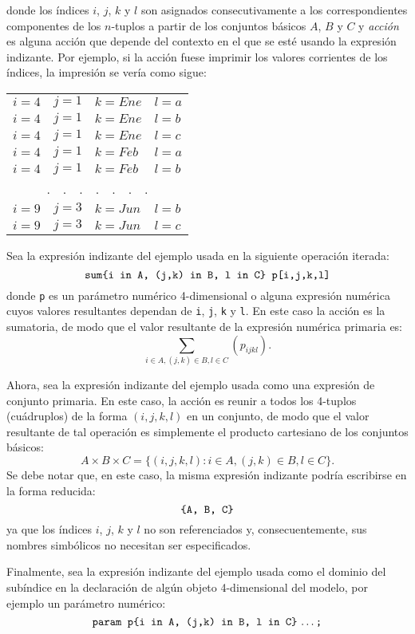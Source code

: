 \documentclass[11pt,spanish]{report}
\begin{document}
\noindent donde los índices $i$, $j$, $k$ y $l$ son asignados consecutivamente a los correspondientes componentes de los $n$-tuplos a partir de los conjuntos básicos $A$, $B$ y $C$ y {\it acción} es alguna acción que depende del contexto en el que se esté usando la expresión indizante. Por ejemplo, si la acción fuese imprimir los valores corrientes de los índices, la impresión se vería como sigue:

\noindent\hfil
\begin{tabular}{@{}llll@{}}
$i=4$&$j=1$&$k=Ene$&$l=a$\\
$i=4$&$j=1$&$k=Ene$&$l=b$\\
$i=4$&$j=1$&$k=Ene$&$l=c$\\
$i=4$&$j=1$&$k=Feb$&$l=a$\\
$i=4$&$j=1$&$k=Feb$&$l=b$\\
\multicolumn{4}{c}{.\ \ .\ \ .\ \ .\ \ .\ \ .\ \ .}\\
$i=9$&$j=3$&$k=Jun$&$l=b$\\
$i=9$&$j=3$&$k=Jun$&$l=c$\\
\end{tabular}

Sea la expresión indizante del ejemplo usada en la siguiente operación iterada:
$$\mbox{{\tt sum\{i in A, (j,k) in B, l in C\} p[i,j,k,l]}}$$
donde {\tt p} es un parámetro numérico 4-dimensional o alguna expresión numérica cuyos valores resultantes dependan de {\tt i}, {\tt j}, {\tt k} y {\tt l}. En este caso la acción es la sumatoria, de modo que el valor resultante de la expresión numérica primaria es:
$$\sum_{i\in A,(j,k)\in B,l\in C}(p_{ijkl}).$$

Ahora, sea la expresión indizante del ejemplo usada como una expresión de conjunto primaria. En este caso, la acción es reunir a todos los 4-tuplos (cuádruplos) de la forma $(i,j,k,l)$ en un conjunto, de modo que el valor resultante de tal operación es simplemente el producto cartesiano de los conjuntos básicos:
$$A\times B\times C=\{(i,j,k,l):i\in A,(j,k)\in B,l\in C\}.$$
Se debe notar que, en este caso, la misma expresión indizante podría escribirse en la forma reducida:
$$\mbox{{\tt\{A, B, C\}}}$$
ya que los índices $i$, $j$, $k$ y $l$ no son referenciados y, consecuentemente, sus nombres simbólicos no necesitan ser especificados.

Finalmente, sea la expresión indizante del ejemplo usada como el dominio del subíndice en la declaración de algún objeto 4-dimensional del modelo, por ejemplo un parámetro numérico:
$$\mbox{{\tt param p\{i in A, (j,k) in B, l in C\}} \dots {\tt;}}$$
\end{document}
